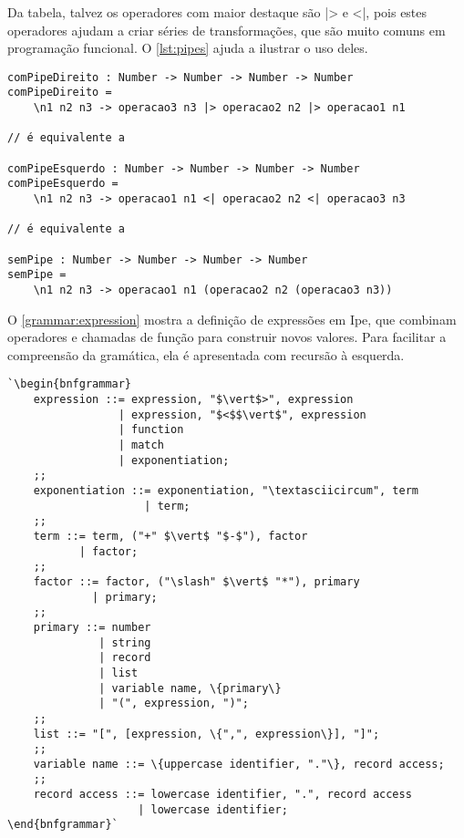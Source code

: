 Da tabela, talvez os operadores com maior destaque são |> e <|, pois estes operadores
ajudam a criar séries de transformações, que são muito comuns em programação funcional.
O \autoref{lst:pipes} ajuda a ilustrar o uso deles.

\begin{lstlisting}[label={lst:pipes},caption={Exemplos de uso dos operadores de pipe}]
comPipeDireito : Number -> Number -> Number -> Number
comPipeDireito =
    \n1 n2 n3 -> operacao3 n3 |> operacao2 n2 |> operacao1 n1

// é equivalente a

comPipeEsquerdo : Number -> Number -> Number -> Number
comPipeEsquerdo =
    \n1 n2 n3 -> operacao1 n1 <| operacao2 n2 <| operacao3 n3

// é equivalente a

semPipe : Number -> Number -> Number -> Number
semPipe =
    \n1 n2 n3 -> operacao1 n1 (operacao2 n2 (operacao3 n3))
\end{lstlisting}

O \autoref{grammar:expression} mostra a definição de expressões em Ipe, que combinam
operadores e chamadas de função para construir novos valores. Para facilitar a
compreensão da gramática, ela é apresentada com recursão à esquerda.

\begin{lstlisting}[label={grammar:expression},caption={Definição de expressões em EBNF},escapechar=`,numbers=none]
`\begin{bnfgrammar}
    expression ::= expression, "$\vert$>", expression
                 | expression, "$<$$\vert$", expression
                 | function
                 | match
                 | exponentiation;
    ;;
    exponentiation ::= exponentiation, "\textasciicircum", term
                     | term;
    ;;
    term ::= term, ("+" $\vert$ "$-$"), factor
           | factor;
    ;;
    factor ::= factor, ("\slash" $\vert$ "*"), primary
             | primary;
    ;;
    primary ::= number
              | string
              | record
              | list
              | variable name, \{primary\}
              | "(", expression, ")";
    ;;
    list ::= "[", [expression, \{",", expression\}], "]";
    ;;
    variable name ::= \{uppercase identifier, "."\}, record access;
    ;;
    record access ::= lowercase identifier, ".", record access
                    | lowercase identifier;
\end{bnfgrammar}`
\end{lstlisting}
